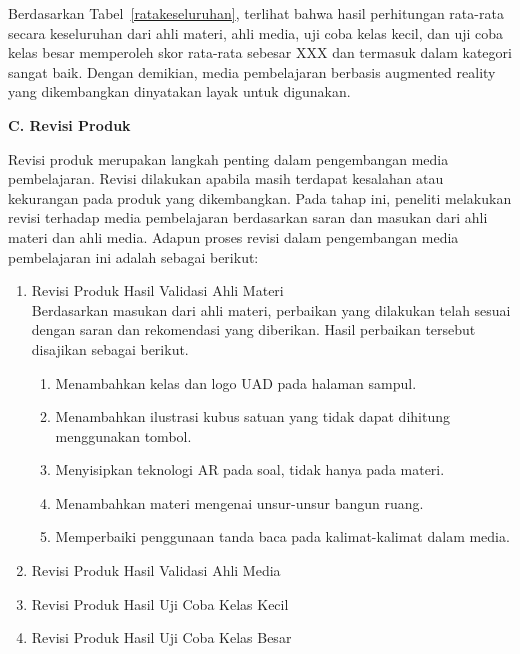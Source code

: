 \documentclass[12pt]{article}
\begin{document}
\begin{enumerate}
\begin{table}[H]
\begin{tabular}{|c|c|c|c|}
        \end{tabular}
    \end{table}
    \hspace*{1cm}Berdasarkan Tabel~\ref{ratakeseluruhan}, terlihat bahwa hasil perhitungan rata-rata secara keseluruhan dari ahli materi, ahli media, uji coba kelas kecil, dan uji coba kelas besar memperoleh skor rata-rata sebesar XXX dan termasuk dalam kategori sangat baik. Dengan demikian, media pembelajaran berbasis augmented reality yang dikembangkan dinyatakan layak untuk digunakan.

\end{enumerate}
\textbf{C. Revisi Produk}

\hspace*{1cm}Revisi produk merupakan langkah penting dalam pengembangan media pembelajaran. Revisi dilakukan apabila masih terdapat kesalahan atau kekurangan pada produk yang dikembangkan. Pada tahap ini, peneliti melakukan revisi terhadap media pembelajaran berdasarkan saran dan masukan dari ahli materi dan ahli media. Adapun proses revisi dalam pengembangan media pembelajaran ini adalah sebagai berikut:
\begin{enumerate}
    \item Revisi Produk Hasil Validasi Ahli Materi\\
    \hspace*{1cm}Berdasarkan masukan dari ahli materi, perbaikan yang dilakukan telah sesuai dengan saran dan rekomendasi yang diberikan. Hasil perbaikan tersebut disajikan sebagai berikut.
    \begin{enumerate}
        \item Menambahkan kelas dan logo UAD pada halaman sampul.
        \item Menambahkan ilustrasi kubus satuan yang tidak dapat dihitung menggunakan tombol.
        \item Menyisipkan teknologi AR pada soal, tidak hanya pada materi.
        \item Menambahkan materi mengenai unsur-unsur bangun ruang.
        \item Memperbaiki penggunaan tanda baca pada kalimat-kalimat dalam media.
    \end{enumerate}
    \item Revisi Produk Hasil Validasi Ahli Media
    \item Revisi Produk Hasil Uji Coba Kelas Kecil
    \item Revisi Produk Hasil Uji Coba Kelas Besar
\end{enumerate}
\end{document}
